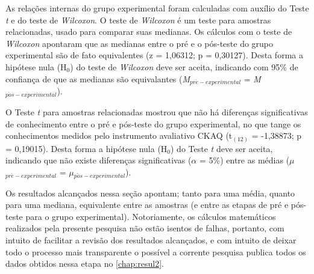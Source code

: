 
As relações internas do grupo experimental foram calculadas com auxílio do Teste \textit{t} e do teste de \textit{Wilcoxon}. O teste de \textit{Wilcoxon} é um teste para amostras relacionadas, usado para comparar suas medianas. Os cálculos com o teste de \textit{Wilcoxon} apontaram que as medianas entre o pré e o pós-teste do grupo experimental são de fato equivalentes (z = 1,06312; p = 0,30127). Desta forma a hipótese nula (H$_0$) do teste de \textit{Wilcoxon} deve ser aceita, indicando com 95\% de confiança de que as medianas são equivalantes (\textit{M}$_{pr\acute{e}-experimental}$ = \textit{M}$_{p\acute{o}s-experimental}$). 

O Teste \textit{t} para amostras relacionadas mostrou que não há diferenças significativas de conhecimento entre o pré e pós-teste do grupo experimental, no que tange os conhecimentos medidos pelo instrumento avaliativo \ac{CKAQ} (t$_{(12)}$ = -1,38873; p = 0,19015). Desta forma a hipótese nula (H$_0$) do Teste \textit{t} deve ser aceita, indicando que não existe diferenças significativas ($\alpha$ = 5\%) entre as médias ($\mu$$_{pr\acute{e}-experimental}$ = $\mu$$_{p\acute{o}s-experimental}$).

Os resultados alcançados nessa seção apontam; tanto para uma média, quanto para uma mediana, equivalente entre as amostras (e entre as etapas de pré e pós-teste para o grupo experimental). Notoriamente, os cálculos matemáticos realizados pela presente pesquisa não estão isentos de falhas, portanto, com intuito de facilitar a revisão dos resultados alcançados, e com intuito de deixar todo o processo mais transparente o possível a corrente pesquisa publica todos os dados obtidos nessa etapa no \autoref{chap:resul2}.


